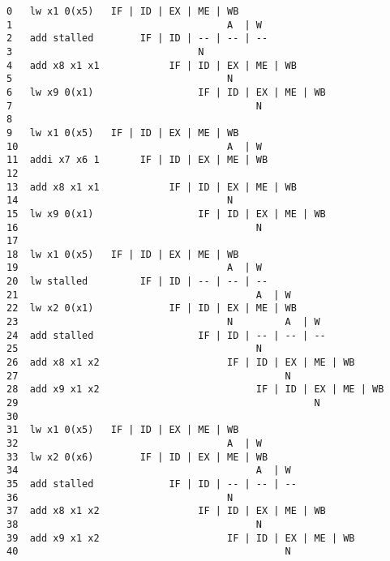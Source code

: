 \documentclass[varwidth, convert]{standalone}
\begin{document}
  \begin{BVerbatim}[]
0   lw x1 0(x5)   IF | ID | EX | ME | WB
1                                     A  | W
2   add stalled        IF | ID | -- | -- | --
3                                N
4   add x8 x1 x1            IF | ID | EX | ME | WB
5                                     N
6   lw x9 0(x1)                  IF | ID | EX | ME | WB
7                                          N
8
9   lw x1 0(x5)   IF | ID | EX | ME | WB
10                                    A  | W
11  addi x7 x6 1       IF | ID | EX | ME | WB
12
13  add x8 x1 x1            IF | ID | EX | ME | WB
14                                    N
15  lw x9 0(x1)                  IF | ID | EX | ME | WB
16                                         N
17
18  lw x1 0(x5)   IF | ID | EX | ME | WB
19                                    A  | W
20  lw stalled         IF | ID | -- | -- | --
21                                         A  | W
22  lw x2 0(x1)             IF | ID | EX | ME | WB
23                                    N         A  | W
24  add stalled                  IF | ID | -- | -- | --
25                                         N
26  add x8 x1 x2                      IF | ID | EX | ME | WB
27                                              N
28  add x9 x1 x2                           IF | ID | EX | ME | WB
29                                                   N
30
31  lw x1 0(x5)   IF | ID | EX | ME | WB
32                                    A  | W
33  lw x2 0(x6)        IF | ID | EX | ME | WB
34                                         A  | W
35  add stalled             IF | ID | -- | -- | --
36                                    N
37  add x8 x1 x2                 IF | ID | EX | ME | WB
38                                         N
39  add x9 x1 x2                      IF | ID | EX | ME | WB
40                                              N
  \end{BVerbatim}
\end{document}
